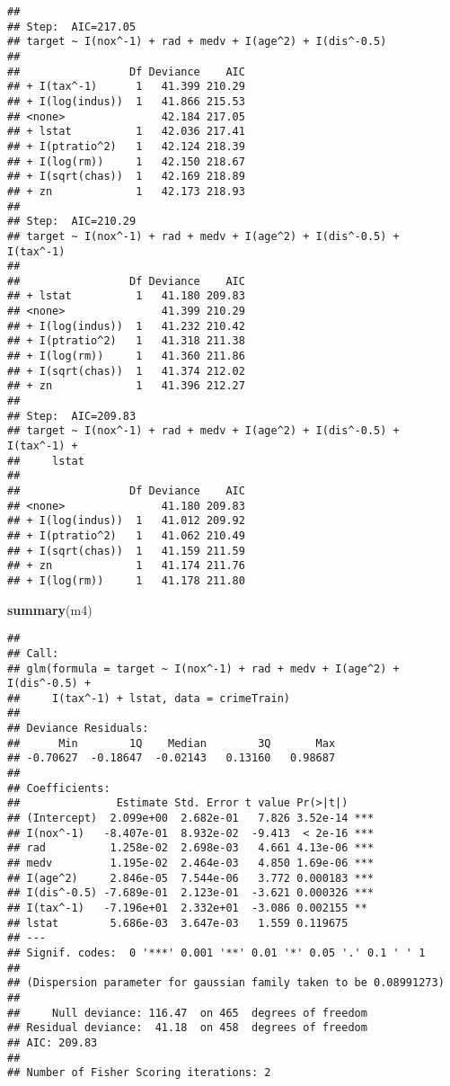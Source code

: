 \documentclass[
]{article}
\newenvironment{Shaded}{\begin{snugshade}}{\end{snugshade}}
\newcommand{\KeywordTok}[1]{\textcolor[rgb]{0.13,0.29,0.53}{\textbf{#1}}}
\newcommand{\NormalTok}[1]{#1}
\begin{document}
\begin{verbatim}
## 
## Step:  AIC=217.05
## target ~ I(nox^-1) + rad + medv + I(age^2) + I(dis^-0.5)
## 
##                 Df Deviance    AIC
## + I(tax^-1)      1   41.399 210.29
## + I(log(indus))  1   41.866 215.53
## <none>               42.184 217.05
## + lstat          1   42.036 217.41
## + I(ptratio^2)   1   42.124 218.39
## + I(log(rm))     1   42.150 218.67
## + I(sqrt(chas))  1   42.169 218.89
## + zn             1   42.173 218.93
## 
## Step:  AIC=210.29
## target ~ I(nox^-1) + rad + medv + I(age^2) + I(dis^-0.5) + I(tax^-1)
## 
##                 Df Deviance    AIC
## + lstat          1   41.180 209.83
## <none>               41.399 210.29
## + I(log(indus))  1   41.232 210.42
## + I(ptratio^2)   1   41.318 211.38
## + I(log(rm))     1   41.360 211.86
## + I(sqrt(chas))  1   41.374 212.02
## + zn             1   41.396 212.27
## 
## Step:  AIC=209.83
## target ~ I(nox^-1) + rad + medv + I(age^2) + I(dis^-0.5) + I(tax^-1) + 
##     lstat
## 
##                 Df Deviance    AIC
## <none>               41.180 209.83
## + I(log(indus))  1   41.012 209.92
## + I(ptratio^2)   1   41.062 210.49
## + I(sqrt(chas))  1   41.159 211.59
## + zn             1   41.174 211.76
## + I(log(rm))     1   41.178 211.80
\end{verbatim}

\begin{Shaded}
\begin{Highlighting}[]
\KeywordTok{summary}\NormalTok{(m4)}
\end{Highlighting}
\end{Shaded}

\begin{verbatim}
## 
## Call:
## glm(formula = target ~ I(nox^-1) + rad + medv + I(age^2) + I(dis^-0.5) + 
##     I(tax^-1) + lstat, data = crimeTrain)
## 
## Deviance Residuals: 
##      Min        1Q    Median        3Q       Max  
## -0.70627  -0.18647  -0.02143   0.13160   0.98687  
## 
## Coefficients:
##               Estimate Std. Error t value Pr(>|t|)    
## (Intercept)  2.099e+00  2.682e-01   7.826 3.52e-14 ***
## I(nox^-1)   -8.407e-01  8.932e-02  -9.413  < 2e-16 ***
## rad          1.258e-02  2.698e-03   4.661 4.13e-06 ***
## medv         1.195e-02  2.464e-03   4.850 1.69e-06 ***
## I(age^2)     2.846e-05  7.544e-06   3.772 0.000183 ***
## I(dis^-0.5) -7.689e-01  2.123e-01  -3.621 0.000326 ***
## I(tax^-1)   -7.196e+01  2.332e+01  -3.086 0.002155 ** 
## lstat        5.686e-03  3.647e-03   1.559 0.119675    
## ---
## Signif. codes:  0 '***' 0.001 '**' 0.01 '*' 0.05 '.' 0.1 ' ' 1
## 
## (Dispersion parameter for gaussian family taken to be 0.08991273)
## 
##     Null deviance: 116.47  on 465  degrees of freedom
## Residual deviance:  41.18  on 458  degrees of freedom
## AIC: 209.83
## 
## Number of Fisher Scoring iterations: 2
\end{verbatim}
\end{document}
